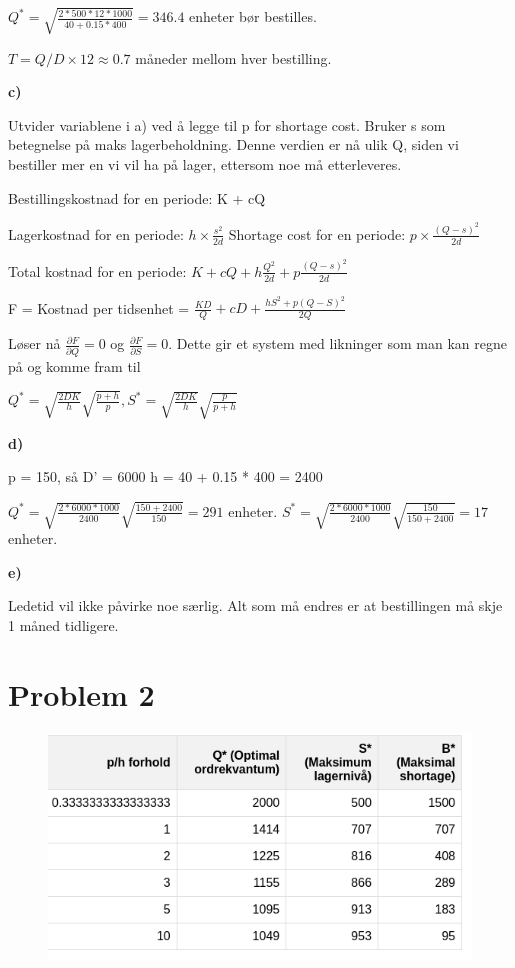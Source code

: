 \documentclass{article}
\begin{document}
$Q^* = \sqrt{\frac{2 * 500 * 12 * 1000}{40 + 0.15*400}} = 346.4$ enheter bør bestilles. 

$T = Q/D \times 12 \approx 0.7$ måneder mellom hver bestilling.

\vspace*{12pt}\small\textbf{c)}

Utvider variablene i a) ved å legge til p for shortage cost. Bruker s som betegnelse på maks lagerbeholdning. Denne verdien er nå
ulik Q, siden vi bestiller mer en vi vil ha på lager, ettersom noe må etterleveres.

\vspace*{12pt}

Bestillingskostnad for en periode: K + cQ

Lagerkostnad for en periode: $h \times \frac{s^2}{2d}$
Shortage cost for en periode: $p \times \frac{(Q-s)^2}{2d}$

Total kostnad for en periode: $K + cQ + h\frac{Q^2}{2d} + p\frac{(Q-s)^2}{2d}$

F = Kostnad per tidsenhet = $\frac{KD}{Q} + cD + \frac{hS^2+p(Q-S)^2}{2Q}$
\vspace*{12pt}

Løser nå $\frac{\partial F}{\partial Q} = 0$ og $\frac{\partial F}{\partial S} = 0$. Dette gir et system med likninger som man kan regne på og komme fram til

$Q^* = \sqrt{\frac{2DK}{h}}\sqrt{\frac{p+h}{p}}, S^* = \sqrt{\frac{2DK}{h}}\sqrt{\frac{p}{p+h}}$

\vspace*{12pt}\small\textbf{d)}

p = 150, så
D' = 6000
h = 40 + 0.15 * 400 = 2400

$Q^* = \sqrt{\frac{2*6000*1000}{2400}}\sqrt{\frac{150+2400}{150}} = 291$ enheter.
$S^* = \sqrt{\frac{2*6000*1000}{2400}}\sqrt{\frac{150}{150 + 2400}} = 17$ enheter.

\vspace*{12pt}\small\textbf{e)}

Ledetid vil ikke påvirke noe særlig. Alt som må endres er at bestillingen må skje 1 måned tidligere.

\pagebreak\section*{\textbf{Problem 2}}

\begin{figure}[ht]
  \includegraphics*[width=\linewidth]{img/2.png}
\end{figure}
\end{document}
